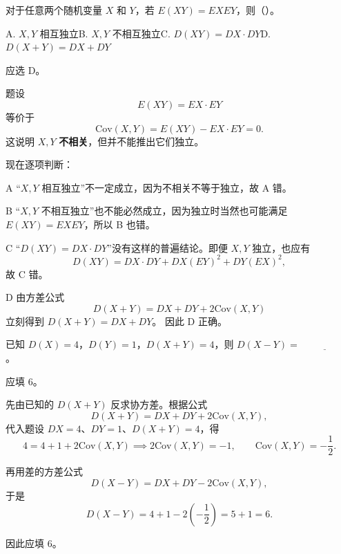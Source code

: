 ﻿\documentclass[lang=cn,11pt]{elegantbook}
\begin{document}
\begin{exercise}\label{exer:4-8-exye}
对于任意两个随机变量 \(X\) 和 \(Y\)，若 \(E(XY) = EXEY\)，则（\quad）。\par
A. \(X,Y\) 相互独立\quad B. \(X,Y\) 不相互独立\quad C. \(D(XY) = DX \cdot DY\)\quad D. \(D(X+Y) = DX + DY\)
\end{exercise}
\begin{solution}
应选 D。

题设
\[
E(XY)=EX\cdot EY
\]
等价于
\[
\mathrm{Cov}(X,Y)=E(XY)-EX\cdot EY=0.
\]
这说明 \(X,Y\) \textbf{不相关}，但并不能推出它们独立。

现在逐项判断：

A “\(X,Y\) 相互独立”不一定成立，因为不相关不等于独立，故 A 错。

B “\(X,Y\) 不相互独立”也不能必然成立，因为独立时当然也可能满足 \(E(XY)=EXEY\)，所以 B 也错。

C “\(D(XY)=DX\cdot DY\)”没有这样的普遍结论。即便 \(X,Y\) 独立，也应有
\[
D(XY)=DX\cdot DY+DX(EY)^2+DY(EX)^2,
\]
故 C 错。

D 由方差公式
\[
D(X+Y)=DX+DY+2\mathrm{Cov}(X,Y)
\]
立刻得到 \(D(X+Y)=DX+DY\)。
因此 D 正确。
\end{solution}

\begin{exercise}\label{exer:4-9-dxy}
已知 \(D(X) = 4\)，\(D(Y) = 1\)，\(D(X+Y) = 4\)，则 \(D(X-Y) =\,\underline{\hspace{2cm}}\)。
\end{exercise}
\begin{solution}
应填 \(6\)。

先由已知的 \(D(X+Y)\) 反求协方差。根据公式
\[
D(X+Y)=DX+DY+2\mathrm{Cov}(X,Y),
\]
代入题设 \(DX=4\)、\(DY=1\)、\(D(X+Y)=4\)，得
\[
4=4+1+2\mathrm{Cov}(X,Y)\implies 2\mathrm{Cov}(X,Y)=-1,\qquad \mathrm{Cov}(X,Y)=-\frac12.
\]

再用差的方差公式
\[
D(X-Y)=DX+DY-2\mathrm{Cov}(X,Y),
\]
于是
\[
D(X-Y)=4+1-2\left(-\frac12\right)=5+1=6.
\]

因此应填 \(6\)。
\end{solution}
\end{document}
